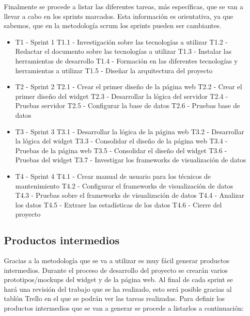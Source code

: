 Finalmente se procede a listar las diferentes tareas, más específicas, que se van a llevar a cabo en los sprints marcados. Esta información es orientativa, ya que sabemos, que en la metodología scrum los sprints pueden ser cambiantes.


\begin{itemize}
	\item T1 - Sprint 1
	\subitem T1.1 - Investigación sobre las tecnologías a utilizar
	\subitem T1.2 - Redactar el documento sobre las tecnologías a utilizar
	\subitem T1.3 - Instalar las herramientas de desarrollo
	\subitem T1.4 - Formación en las diferentes tecnologías y herramientas a utilizar
	\subitem T1.5 - Diseñar la arquitectura del proyecto
	\item T2 - Sprint 2
	\subitem T2.1 - Crear el primer diseño de la página web
	\subitem T2.2 - Crear el primer diseño del widget
	\subitem T2.3 -	Desarrollar la lógica del servidor
	\subitem T2.4 - Pruebas servidor
	\subitem T2.5 - Configurar la base de datos
	\subitem T2.6 - Pruebas base de datos
	\item T3 - Sprint 3
	\subitem T3.1 - Desarrollar la lógica de la página web
	\subitem T3.2 - Desarrollar la lógica del widget
	\subitem T3.3 - Consolidar el diseño de la página web
	\subitem T3.4 - Pruebas de la página web
	\subitem T3.5 - Consolidar el diseño del widget
	\subitem T3.6 - Pruebas del widget
	\subitem T3.7 - Investigar los frameworks de visualización de datos
	\item T4 - Sprint 4
	\subitem T4.1 - Crear manual de usuario para los técnicos de mantenimiento
	\subitem T4.2 - Configurar el frameworks de visualización de datos
	\subitem T4.3 - Pruebas sobre el frameworks de visualización de datos
	\subitem T4.4 - Analizar los datos
	\subitem T4.5 - Extraer las estadísticas de los datos
	\subitem T4.6 - Cierre del proyecto
\end{itemize}


\subsection{Productos intermedios}
Gracias a la metodología que se va a utilizar es muy fácil generar productos intermedios. Durante el proceso de desarrollo del proyecto se crearán varios prototipos/mockups del widget y de la página web. Al final de cada sprint se hará una revisión del trabajo que se ha realizado, esto será posible gracias al tablón Trello en el que se podrán ver las tareas realizadas. Para definir los productos intermedios que se van a generar se procede a listarlos a continuación:

